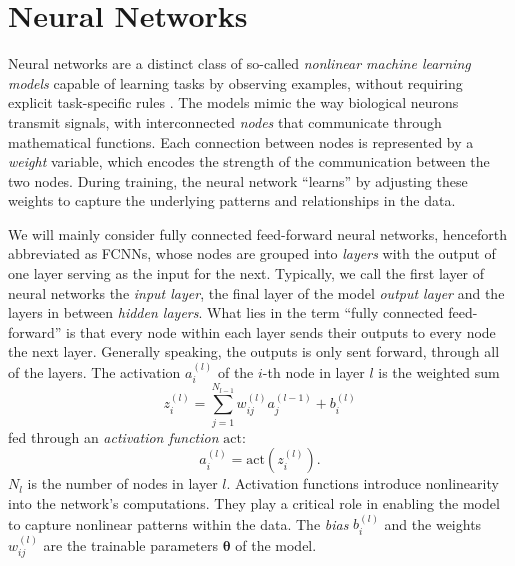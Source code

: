 \documentclass[a4paper, UKenglish, 11pt]{uiomaster}
\begin{document}
\section{Neural Networks}

Neural networks are a distinct class of so-called \emph{nonlinear machine learning models} capable of learning tasks by observing examples, without requiring explicit task-specific rules \cite{Hjorth-Jensen2022}. The models mimic the way biological neurons transmit signals, with interconnected \emph{nodes} that communicate through mathematical functions. Each connection between nodes is represented by a \emph{weight} variable, which encodes the strength of the communication between the two nodes. During training, the neural network ``learns'' by adjusting these weights to capture the underlying patterns and relationships in the data.

We will mainly consider fully connected feed-forward neural networks, henceforth abbreviated as FCNNs, whose nodes are grouped into \emph{layers} with the output of one layer serving as the input for the next. Typically, we call the first layer of neural networks the \emph{input layer}, the final layer of the model \emph{output layer} and the layers in between \emph{hidden layers}. What lies in the term ``fully connected feed-forward'' is that every node within each layer sends their outputs to every node the next layer. Generally speaking, the outputs is only sent forward, through all of the layers.
The activation $a_i^{(l)}$ of the $i$-th node in layer $l$ is the weighted sum
\begin{equation}
  z_i^{(l)} = \sum_{j=1}^{N_{l-1}} w_{ij}^{(l)} a_{j}^{(l-1)} + b_i^{(l)}
  \label{activation_node}
\end{equation}
fed through an \emph{activation function} \(\text{act}\):
\begin{equation}
  a_i^{(l)} = \text{act} \left( z_i^{(l)} \right).
\end{equation}
$N_{l}$ is the number of nodes in layer \(l\).
Activation functions introduce nonlinearity into the network's computations. They play a critical role in enabling the model to capture nonlinear patterns within the data. The \emph{bias} \(b_i^{(l)}\) and the weights \(w_{ij}^{(l)}\) are the trainable parameters \(\boldsymbol \theta\) of the model.


\end{document}

